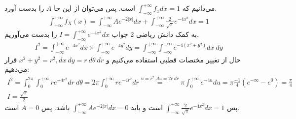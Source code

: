 \\
\\
می‌دانیم که
$\int_{-\infty}^{+\infty} f_x dx = 1$
است. پس می‌توان از این جا
$A$
را بدست آورد.
\begin{gather*}
    \int_{-\infty}^{+\infty} f_X(x) = \int_{-\infty}^{+\infty} A e^{-2|x|} dx + \int_{-\infty}^{+\infty} \frac{2}{\sqrt{\pi}} e^{-4x^2} dx = 1
\end{gather*}
به کمک دانش ریاضی 2 جواب
$I = \int_{-\infty}^{+\infty} e^{-4x^2} dx$
را بدست می‌آوریم.
\begin{gather*}
    I^2 = \int_{-\infty}^{+\infty} e^{-4x^2} dx \times \int_{-\infty}^{+\infty} e^{-4y^2} dy =
    \int_{-\infty}^{+\infty}\int_{-\infty}^{+\infty} e^{-4(x^2 + y^2)} dx ~ dy
\end{gather*}
حال از تغییر مختصات قطبی استفاده می‌کنیم و
$x^2+y^2=r^2, dx ~ dy = r ~ d \theta ~ dr $
قرار می‌دهیم:
\begin{gather*}
    I^2 = \int_{0}^{2\pi} \int_{0}^{+\infty}  r e^{-4r^2} dr ~ d \theta = 2\pi \int_{0}^{+\infty}  r e^{-4r^2} dr
    \stackrel{u=r^2, du = 2r ~ dr}{=}  \pi \int_{0}^{+\infty}  e^{-4u} du =  \pi \frac{-1}{4} (e^{-\infty} - e^0) = \frac{\pi}{4}
    \\
    I = \frac{\sqrt{\pi}}{2}
\end{gather*}
پس
$\int_{-\infty}^{+\infty} \frac{2}{\sqrt{\pi}} e^{-4x^2} dx = 1$
است و باید
$\int_{-\infty}^{+\infty} A e^{-2|x|} dx = 0$
باشد. پس
$A=0$
است.

